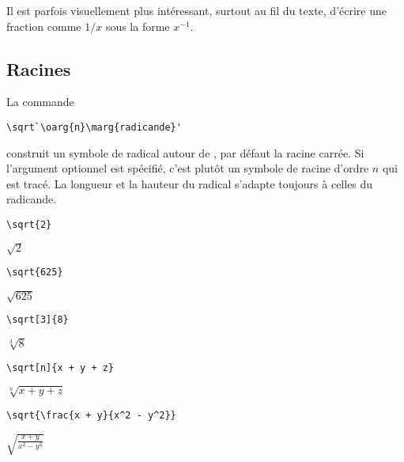 \begin{conseil}
  Il est parfois visuellement plus intéressant, surtout au fil du
  texte, d'écrire une fraction comme $1/x$ sous la forme $x^{-1}$.
\end{conseil}

\subsection{Racines}
\label{sec:math:bases:racines}

La commande
\begin{lstlisting}
\sqrt`\oarg{n}\marg{radicande}'
\end{lstlisting}
construit un symbole de radical autour de , par défaut
la racine carrée. Si l'argument optionnel  est spécifié, c'est
plutôt un symbole de racine d'ordre $n$ qui est tracé. La longueur et
la hauteur du radical s'adapte toujours à celles du radicande.
\begin{demo}
  \begin{minipage}{0.3\linewidth}
    \begin{texample}[0.6\linewidth]
\begin{lstlisting}
\sqrt{2}
\end{lstlisting}
      \producing $\sqrt{2}$
    \end{texample}
  \end{minipage}
  \quad
  \begin{minipage}{0.3\linewidth}
    \begin{texample}[0.6\linewidth]
\begin{lstlisting}
\sqrt{625}
\end{lstlisting}
      \producing
      $\sqrt{625}$
    \end{texample}
  \end{minipage}
  \quad
  \begin{minipage}{0.3\linewidth}
    \begin{texample}[0.6\linewidth]
\begin{lstlisting}
\sqrt[3]{8}
\end{lstlisting}
      \producing
      $\sqrt[3]{8}$
    \end{texample}
  \end{minipage}

  \begin{texample}
\begin{lstlisting}
\sqrt[n]{x + y + z}
\end{lstlisting}
    \producing
    $\sqrt[n]{x + y + z}$
  \end{texample}

  \begin{texample}
\begin{lstlisting}
\sqrt{\frac{x + y}{x^2 - y^2}}
\end{lstlisting}
    \producing
    $\displaystyle \sqrt{\frac{x + y}{x^2 - y^2}}$
  \end{texample}
\end{demo}

